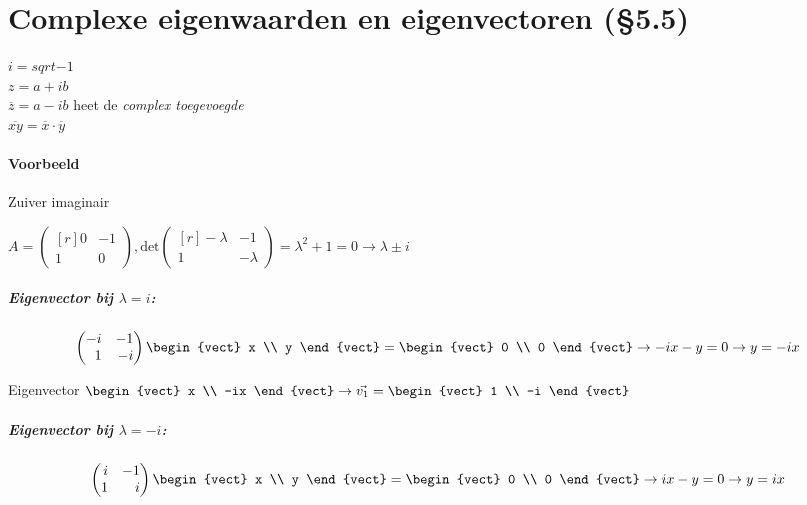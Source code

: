 \section{Complexe eigenwaarden en eigenvectoren (\S5.5)}
$i = sqrt{-1}$ \\
$z = a+ib$ \\
$\overline{z} = a-ib$ heet de \emph{complex toegevoegde} \\
$\overline{xy} = \overline{x} \cdot \overline{y}$

\paragraph{Voorbeeld} Zuiver imaginair

$A = \begin{pmatrix*}[r] 0 & -1 \\ 1 & 0 \end{pmatrix*}, \mbox{det} \begin{pmatrix*}[r] - \lambda & -1 \\ 1 & - \lambda \end{pmatrix*} = \lambda^2 + 1 = 0 \to \lambda \pm i$

\subparagraph{Eigenvector bij $\lambda = i$:}
\[ \begin{pmatrix*}[r] -i & -1 \\ 1 & -i \end{pmatrix*} \begin{vect} x \\ y \end{vect} = \begin{vect} 0 \\ 0 \end{vect} \to -ix-y = 0 \to y = -ix \]

Eigenvector $\begin{vect} x \\ -ix \end{vect} \to \vec{v_1} = \begin{vect} 1 \\ -i \end{vect}$

\subparagraph{Eigenvector bij $\lambda = -i$:}
\[ \begin{pmatrix*}[r] i & -1 \\ 1 & i \end{pmatrix*} \begin{vect} x \\ y \end{vect} = \begin{vect} 0 \\ 0 \end{vect} \to ix-y = 0 \to y = ix \]

